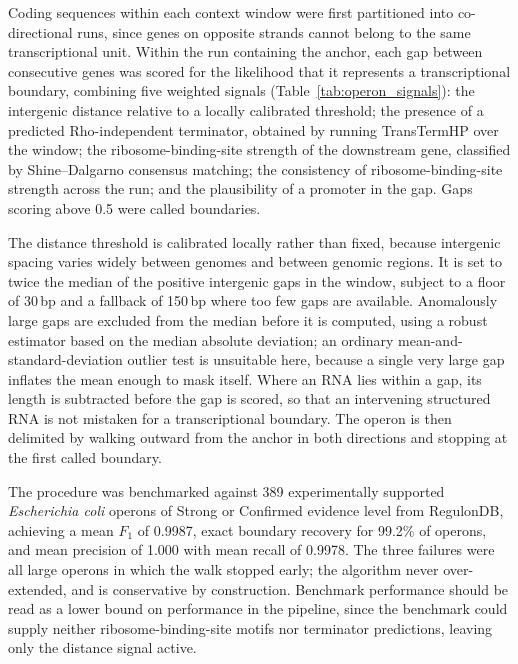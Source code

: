 Coding sequences within each context window were first partitioned into
co-directional runs, since genes on opposite strands cannot belong to the same
transcriptional unit. Within the run containing the anchor, each gap between
consecutive genes was scored for the likelihood that it represents a transcriptional
boundary, combining five weighted signals (Table~\ref{tab:operon_signals}):
the intergenic distance relative to a locally calibrated threshold; the presence of a
predicted Rho-independent terminator, obtained by running TransTermHP over the
window; the ribosome-binding-site strength of the downstream gene, classified by
Shine--Dalgarno consensus matching; the consistency of ribosome-binding-site strength
across the run; and the plausibility of a promoter in the gap. Gaps scoring above 0.5
were called boundaries.

The distance threshold is calibrated locally rather than fixed, because intergenic
spacing varies widely between genomes and between genomic regions. It is set to twice
the median of the positive intergenic gaps in the window, subject to a floor of
30\,bp and a fallback of 150\,bp where too few gaps are available. Anomalously large
gaps are excluded from the median before it is computed, using a robust estimator
based on the median absolute deviation; an ordinary mean-and-standard-deviation
outlier test is unsuitable here, because a single very large gap inflates the mean
enough to mask itself. Where an RNA lies within a gap, its length is subtracted
before the gap is scored, so that an intervening structured RNA is not mistaken for
a transcriptional boundary. The operon is then delimited by walking outward from the
anchor in both directions and stopping at the first called boundary.

The procedure was benchmarked against 389 experimentally supported \emph{Escherichia
coli} operons of Strong or Confirmed evidence level from RegulonDB, achieving a mean
$F_1$ of 0.9987, exact boundary recovery for 99.2\% of operons, and mean precision of
1.000 with mean recall of 0.9978. The three failures were all large operons in which
the walk stopped early; the algorithm never over-extended, and is conservative by
construction. Benchmark performance should be read as a lower bound on performance in
the pipeline, since the benchmark could supply neither ribosome-binding-site motifs
nor terminator predictions, leaving only the distance signal active.

